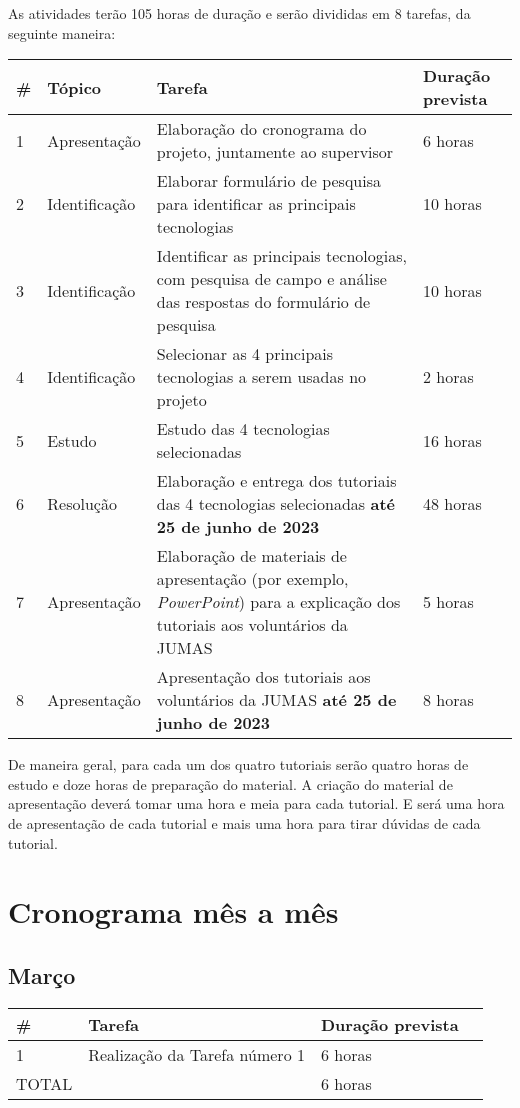\documentclass{article}
\begin{document}
As atividades terão 105 horas de duração e serão divididas em 8 tarefas, da seguinte maneira:

\begin{center}
  \begin{tabular}{ | l | l | p{5cm} | l | }
    \hline
    \# & Tópico & Tarefa & Duração prevista \\ \hline
    1 & Apresentação & Elaboração do cronograma do projeto, juntamente ao supervisor & 6 horas \\ \hline
    2 & Identificação & Elaborar formulário de pesquisa para identificar as principais tecnologias & 10 horas \\ \hline
    3 & Identificação & Identificar as principais tecnologias, com pesquisa de campo e análise das respostas do formulário de pesquisa & 10 horas \\ \hline
    4 & Identificação & Selecionar as 4 principais tecnologias a serem usadas no projeto & 2 horas \\ \hline
    5 & Estudo & Estudo das 4 tecnologias selecionadas  & 16 horas \\ \hline
    6 & Resolução & Elaboração e entrega dos tutoriais das 4 tecnologias selecionadas \textbf{até 25 de junho de 2023} & 48 horas  \\ \hline
    7 & Apresentação & Elaboração de materiais de apresentação (por exemplo, \textit{PowerPoint}) para a explicação dos tutoriais aos voluntários da JUMAS & 5 horas  \\ \hline
    8 & Apresentação & Apresentação dos tutoriais aos voluntários da JUMAS \textbf{até 25 de junho de 2023} & 8 horas  \\ \hline
 \end{tabular}
\end{center}

De maneira geral, para cada um dos quatro tutoriais serão quatro horas de estudo e doze horas de preparação do material. A criação do material de apresentação deverá tomar uma hora e meia para cada tutorial. E será uma hora de apresentação de cada tutorial e mais uma hora para tirar dúvidas de cada tutorial.


\section{Cronograma mês a mês}

\subsection{Março}
\begin{center}
  \begin{tabular}{ | l | l | p{5cm} | l | }
    \hline
    \# & Tarefa & Duração prevista \\ \hline
    1 & Realização da Tarefa número 1 & 6 horas \\ \hline
    TOTAL && 6 horas \\ \hline
 \end{tabular}
\end{center}
\end{document}
